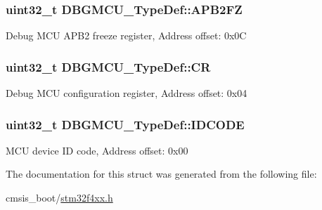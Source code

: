 \subsubsection[{\texorpdfstring{A\+P\+B2\+FZ}{APB2FZ}}]{ uint32\+\_\+t D\+B\+G\+M\+C\+U\+\_\+\+Type\+Def\+::\+A\+P\+B2\+FZ}\hypertarget{struct_d_b_g_m_c_u___type_def_a011f892d86367dbe786964b14bc515a6}{}\label{struct_d_b_g_m_c_u___type_def_a011f892d86367dbe786964b14bc515a6}
Debug M\+CU A\+P\+B2 freeze register, Address offset\+: 0x0C 
\subsubsection[{\texorpdfstring{CR}{CR}}]{ uint32\+\_\+t D\+B\+G\+M\+C\+U\+\_\+\+Type\+Def\+::\+CR}\hypertarget{struct_d_b_g_m_c_u___type_def_a15981828f2b915d38570cf6684e99a53}{}\label{struct_d_b_g_m_c_u___type_def_a15981828f2b915d38570cf6684e99a53}
Debug M\+CU configuration register, Address offset\+: 0x04 
\subsubsection[{\texorpdfstring{I\+D\+C\+O\+DE}{IDCODE}}]{ uint32\+\_\+t D\+B\+G\+M\+C\+U\+\_\+\+Type\+Def\+::\+I\+D\+C\+O\+DE}\hypertarget{struct_d_b_g_m_c_u___type_def_a0cc3561c124d06bb57dfa855e43ed99f}{}\label{struct_d_b_g_m_c_u___type_def_a0cc3561c124d06bb57dfa855e43ed99f}
M\+CU device ID code, Address offset\+: 0x00 

The documentation for this struct was generated from the following file\+:\begin{DoxyCompactItemize}
\item 
cmsis\+\_\+boot/\hyperlink{stm32f4xx_8h}{stm32f4xx.\+h}\end{DoxyCompactItemize}
